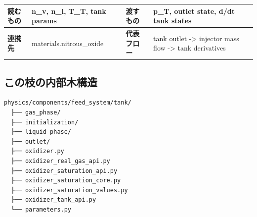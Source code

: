\documentclass[9pt,a4paper,landscape]{article}
\newenvironment{codepanel}{\begin{tcolorbox}[enhanced,breakable,colback=soft,colframe=line,boxrule=0.35pt,arc=1.2mm,left=2mm,right=2mm,top=1mm,bottom=1mm]}{\end{tcolorbox}}
\begin{document}
\begin{tabularx}{\textwidth}{p{}Y p{0.14\textwidth}Y}
\toprule
\textbf{読むもの} & n\_v, n\_l, T\_T, tank params & \textbf{渡すもの} & p\_T, outlet state, d/dt tank states \\
\midrule
\textbf{連携先} & materials.nitrous\_oxide & \textbf{代表フロー} & tank outlet -> injector mass flow -> tank derivatives \\
\bottomrule\end{tabularx}
\vspace{3mm}
\begin{minipage}[t]{0.36\textwidth}
\subsection*{この枝の内部木構造}
\begin{codepanel}\small
\begin{Verbatim}[fontsize=\small,commandchars=\\\{\}]
physics/components/feed_system/tank/
  ├── gas_phase/
  ├── initialization/
  ├── liquid_phase/
  ├── outlet/
  ├── oxidizer.py
  ├── oxidizer_real_gas_api.py
  ├── oxidizer_saturation_api.py
  ├── oxidizer_saturation_core.py
  ├── oxidizer_saturation_values.py
  ├── oxidizer_tank_api.py
  └── parameters.py
\end{Verbatim}
\end{codepanel}
\end{minipage}\hfill
\end{document}
